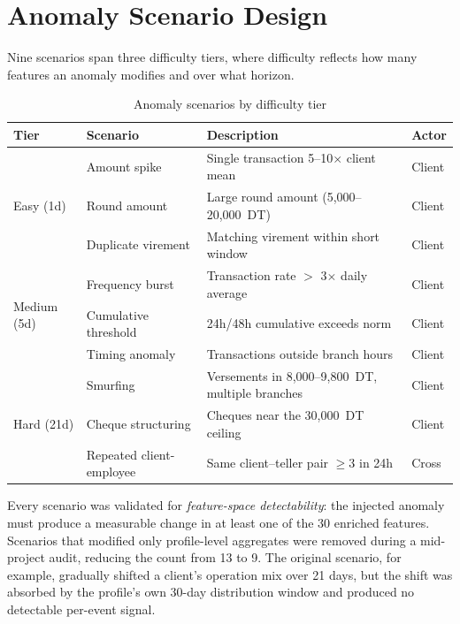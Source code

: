 \section{Anomaly Scenario Design}

Nine scenarios span three difficulty tiers, where difficulty reflects how many features an anomaly modifies and over what horizon.

\begin{table}[htbp]
\centering
\small
\caption{Anomaly scenarios by difficulty tier}
\begin{tabular}{@{}llp{6.6cm}l@{}}
\toprule
\textbf{Tier} & \textbf{Scenario} & \textbf{Description} & \textbf{Actor} \\
\midrule
\multirow{3}{*}{Easy (1d)}
 & Amount spike & Single transaction 5--10$\times$ client mean & Client \\
 & Round amount & Large round amount (5{,}000--20{,}000~DT) & Client \\
 & Duplicate virement & Matching virement within short window & Client \\
\midrule
\multirow{3}{*}{Medium (5d)}
 & Frequency burst & Transaction rate $>$ 3$\times$ daily average & Client \\
 & Cumulative threshold & 24h/48h cumulative exceeds norm & Client \\
 & Timing anomaly & Transactions outside branch hours & Client \\
\midrule
\multirow{3}{*}{Hard (21d)}
 & Smurfing & Versements in 8{,}000--9{,}800~DT, multiple branches & Client \\
 & Cheque structuring & Cheques near the 30{,}000~DT ceiling & Client \\
 & Repeated client-employee & Same client--teller pair $\geq$3 in 24h & Cross \\
\bottomrule
\end{tabular}
\end{table}

Every scenario was validated for \emph{feature-space detectability}: the injected anomaly must produce a measurable change in at least one of the 30 enriched features. Scenarios that modified only profile-level aggregates were removed during a mid-project audit, reducing the count from 13 to 9. The original  scenario, for example, gradually shifted a client's operation mix over 21 days, but the shift was absorbed by the profile's own 30-day distribution window and produced no detectable per-event signal.

